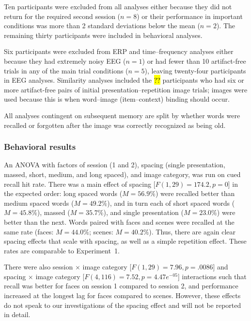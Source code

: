 

Ten participants were excluded from all analyses either because they did not return for the required second session ($n=8$) or their performance in important conditions was more than 2 standard deviations below the mean ($n=2$).  The remaining thirty participants were included in behavioral analyses.

Six participants were excluded from ERP and time--frequency analyses either because they had extremely noisy EEG ($n=1$) or had fewer than 10 artifact-free trials in any of the main trial conditions ($n=5$), leaving twenty-four participants in EEG analyses.  Similarity analyses included the \hl{??} participants who had six or more artifact-free pairs of initial presentation--repetition image trials; images were used because this is when word--image (item--context) binding should occur.

All analyses contingent on subsequent memory are split by whether words were recalled or forgotten after the image was correctly recognized as being old.

\subsubsection{Behavioral results}

An ANOVA with factors of session (1 and 2), spacing (single presentation, massed, short, medium, and long spaced), and image category, was run on cued recall hit rate.  There was a main effect of spacing [$F(1,29)=174.2, p=0$] in the expected order: long spaced words ($M=56.9\%$) were recalled better than medium spaced words ($M=49.2\%$), and in turn each of short spaced words ($M=45.8\%$), massed ($M=35.7\%$), and single presentation ($M=23.0\%$) were better than the next.  Words paired with faces and scenes were recalled at the same rate (faces: $M=44.0\%$; scenes: $M=40.2\%$).  Thus, there are again clear spacing effects that scale with spacing, as well as a simple repetition effect. These rates are comparable to Experiment~1.

There were also session $\times$ image category [$F(1,29)=7.96, p=.0086$] and spacing $\times$ image category [$F(4,116)=7.52, p=4.47e^{-05}$] interactions such that recall was better for faces on session 1 compared to session 2, and performance increased at the longest lag for faces compared to scenes.  However, these effects do not speak to our investigations of the spacing effect and will not be reported in detail.

